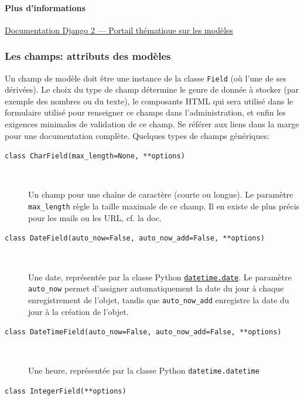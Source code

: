 \documentclass[a4paper, 10pt]{article}
\begin{document}
{\paragraph{Plus d'informations} \href{https://docs.djangoproject.com/fr/2.0/topics/db/}{Documentation Django 2 --- Portail thématique sur les modèles}

\subsubsection{Les champs: attributs des modèles}

Un champ  de modèle doit être une instance de la classe \texttt{Field} (où l'une de ses dérivées). Le choix du type de champ détermine le genre de donnée à stocker (par exemple des nombres ou du texte), le composants HTML qui sera utilisé dans le formulaire utilisé pour renseigner ce champs dans l'administration, et enfin les exigences minimales de validation de ce champ. Se référer aux liens dans la marge pour une documentation complète. Quelques types de champs génériques:
\begin{description}
    \item[\texttt{class CharField(max_length=None, **options)}]~

    Un champ pour une chaîne de caractère (courte ou longue). Le paramètre \texttt{max\_length} règle la taille maximale de ce champ. Il en existe de plus précis pour les mails ou les URL, cf. la doc.

    \item[\texttt{class DateField(auto_now=False, auto_now_add=False, **options)}]~

    Une date, représentée par la classe Python \hyperref[datetime]{\texttt{datetime.date}}. Le paramètre \texttt{auto\_now} permet d'assigner automatiquement la date du jour à chaque enregistrement de l'objet, tandis que \texttt{auto\_now\_add} enregistre la date du jour à la création de l'objet.

    \item[\texttt{class DateTimeField(auto_now=False, auto_now_add=False, **options)}]~

    Une heure, représentée par la classe Python \texttt{datetime.datetime}

    \item[\texttt{class IntegerField(**options)}]~


\end{description}}
\end{document}
